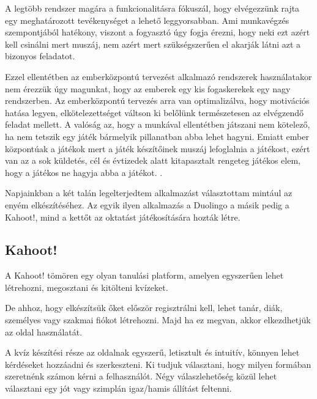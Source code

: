 

A legtöbb rendszer magára a funkcionalitásra fókuszál, hogy elvégezzünk rajta egy meghatározott tevékenységet a lehető leggyorsabban. Ami munkavégzés szempontjából hatékony, viszont a fogyasztó úgy fogja érezni, hogy neki ezt azért kell csinálni mert muszáj, nem azért mert szükségszerűen el akarják látni azt a bizonyos feladatot. \newline

Ezzel ellentétben az emberközpontú tervezést alkalmazó rendszerek használatakor nem érezzük úgy magunkat, hogy az emberek egy kis fogaskerekek egy nagy rendszerben. Az emberközpontú tervezés arra van optimalizálva, hogy motivációs hatása legyen, elkötelezettséget váltson ki belőlünk természetesen az elvégzendő feladat mellett. A valóság az, hogy a munkával ellentétben játszani nem kötelező, ha nem tetszik egy játék bármelyik pillanatban abba lehet hagyni. Emiatt ember központúak a játékok mert a játék készítőinek muszáj lefoglalnia a játékost, ezért van az a sok küldetés, cél és évtizedek alatt kitapasztalt rengeteg játékos elem, hogy a játékos ne hagyja abba a játékot. \cite{actionablegamification}.


Napjainkban a két talán legelterjedtem alkalmazást választottam mintául az enyém elkészítéséhez. Az egyik ilyen alkalmazás a Duolingo\cite{duolingo} a másik pedig a Kahoot!\cite{kahoot}, mind a kettőt az oktatást játékosítására hozták létre.

\subsection{Kahoot!}

A Kahoot! tömören egy olyan tanulási platform, amelyen egyszerűen lehet létrehozni, megosztani és kitölteni kvízeket. \newline

De ahhoz, hogy elkészítsük őket először regisztrálni kell, lehet tanár, diák, személyes vagy szakmai fiókot létrehozni. Majd ha ez megvan, akkor elkezdhetjük az oldal használatát. \newline

A kvíz készítési része az oldalnak egyszerű, letisztult és intuitív, könnyen lehet kérdéseket hozzáadni és szerkeszteni. Ki tudjuk választani, hogy milyen formában szeretnénk számon kérni a felhasználót. Négy válaszlehetőség közül lehet választani egy jót vagy szimplán igaz/hamis állítást feltenni.

